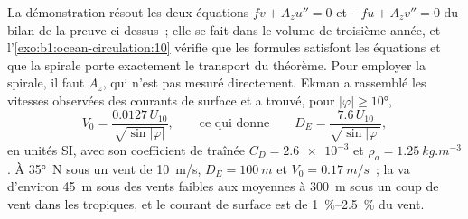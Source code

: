 La démonstration résout les deux équations $f v + A_z u'' = 0$ et $-f u + A_z v'' =
0$ du bilan de la preuve ci-dessus~; elle se fait dans le volume de troisième année, et
l'\cref{exo:b1:ocean-circulation:10} vérifie que les formules satisfont les équations
et que la spirale porte exactement le transport du théorème. Pour employer la
spirale, il faut $A_z$, qui n'est pas mesuré directement. Ekman a rassemblé les
vitesses observées des courants de surface et a trouvé, pour $|\varphi| \geq \ang{10}$,
\[
  V_0 = \frac{0.0127\,U_{10}}{\sqrt{\sin|\varphi|}},
  \qquad\text{ce qui donne}\qquad
  D_E = \frac{7.6\,U_{10}}{\sqrt{\sin|\varphi|}},
\]
en unités SI, avec son coefficient de traînée $C_D = \num{2.6e-3}$ et $\rho_a =
\qty{1.25}{kg.m^{-3}}$. À \ang{35}~N sous un vent de \qty{10}{m/s}, $D_E =
\qty{100}{m}$ et $V_0 = \qty{0.17}{m/s}$~; la  va d'environ
\qty{45}{m} sous des vents faibles aux  moyennes à \qty{300}{m} sous un coup de vent dans les
tropiques, et le courant de surface est de \qtyrange{1}{2.5}{\percent} du vent.

